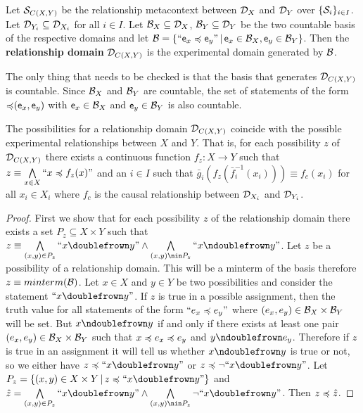 \begin{mathSection}
	\begin{defn}
		Let $\logCtx_{C(X,Y)}$ be the relationship metacontext between $\edomain_X$ and $\edomain_Y$ over $\{ \logCtx_i \}_{i \in I}$. Let $\edomain_{Y_i} \subseteq \edomain_{X_i}$ for all $i \in I$. Let $\basis_X \subseteq \edomain_X$,  $\basis_Y \subseteq \edomain_Y$ be the two countable basis of the respective domains and let $\basis = \{ ``\stmt[e]_x \narrower \stmt[e]_y" \, | \,  \stmt[e]_x \in \basis_X, \stmt[e]_y \in \basis_Y\}$. Then the \textbf{relationship domain} $\edomain_{C(X,Y)}$ is the experimental domain generated by $\basis$.
	\end{defn}
	\begin{check}
		The only thing that needs to be checked is that the basis that generates $\edomain_{C(X,Y)}$ is countable. Since $\basis_X$ and $\basis_Y$ are countable, the set of statements of the form $\mathbin{\narrower}(\stmt[e]_x, \stmt[e]_y)$ with $\stmt[e]_x \in \basis_X$ and $ \stmt[e]_y \in \basis_Y$ is also countable.
	\end{check}
	\begin{prop}\label{pm-cd-relationshipDomainIsContinuousFunctions}
		The possibilities for a relationship domain $\edomain_{C(X,Y)}$ coincide with the possible experimental relationships between $X$ and $Y$. That is, for each possibility $z$ of $\edomain_{C(X,Y)}$ there exists a continuous function $f_z : X \to Y$ such that $z\equiv\bigAND\limits_{x\in X} ``x \narrower f_z(x)"$ and an $i \in I$ such that $\bar{g}_i(f_z(\bar{f}_i^{-1}(x_i))) \equiv f_c (x_i)$ for all $x_i \in X_i$ where $f_c$ is the causal relationship between $\edomain_{X_i}$ and $\edomain_{Y_i}$.
	\end{prop}
	\begin{proof}
		First we show that for each possibility $z$ of the relationship domain there exists a set $P_z \subseteq X \times Y$ such that $z \equiv \bigAND\limits_{(x,y) \in P_z} ``x \comp y"  \AND \bigAND\limits_{(x,y) \nin P_z} ``x \ncomp y"$. Let $z$ be a possibility of a relationship domain. This will be a minterm of the basis therefore $z \equiv minterm(\basis)$. Let $x \in X$ and $y \in Y$ be two possibilities and consider the statement $``x \comp y"$. If $z$ is true in a possible assignment, then the truth value for all statements of the form $``e_x \narrower e_y"$ where $(e_x, e_y) \in \basis_X \times \basis_Y$ will be set. But $x \ncomp y$ if and only if there exists at least one pair $(e_x, e_y) \in \basis_X \times \basis_Y$ such that $x \narrower e_x \narrower e_y$ and $y \ncomp e_y$. Therefore if $z$ is true in an assignment it will tell us whether $x \ncomp y$ is true or not, so we either have $z \narrower ``x \comp y"$ or $z \narrower \NOT ``x \comp y"$. Let $P_z = \{ (x,y) \in X \times Y \, | \, z \narrower ``x \comp y" \}$ and $\hat{z} = \bigAND\limits_{(x,y) \in P_z} ``x \comp y" \AND  \bigAND\limits_{(x,y) \nin P_z} \NOT ``x \comp y" $. Then $z \narrower \hat{z}$.
		

\end{proof}
\end{mathSection}

